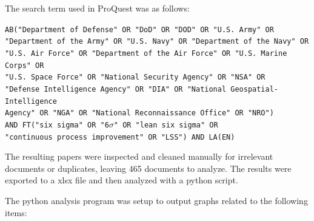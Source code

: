 \documentclass{article}
\begin{document}
	The search term used in ProQuest was as follows:

	\begin{minipage}{\linewidth}
	\begin{spacing}{0.8}
	\noindent\texttt{AB("Department of Defense" OR "DoD" OR "DOD" OR "U.S. Army" OR} \\
	\texttt{"Department of the Army" OR "U.S. Navy" OR "Department of the Navy" OR} \\
	\texttt{"U.S. Air Force" OR "Department of the Air Force" OR "U.S. Marine Corps" OR} \\
	\texttt{"U.S. Space Force" OR "National Security Agency" OR "NSA" OR} \\
	\texttt{"Defense Intelligence Agency" OR "DIA" OR "National Geospatial-Intelligence} \\
	\texttt{Agency" OR "NGA" OR "National Reconnaissance Office" OR "NRO")} \\
	\texttt{AND FT("six sigma" OR "6$\sigma$" OR "lean six sigma" OR} \\
	\texttt{"continuous process improvement" OR "LSS") AND LA(EN)}
	\end{spacing}
	\end{minipage}


	The resulting papers were inspected and cleaned manually for irrelevant documents or duplicates, leaving 465 documents to analyze.
	The results were exported to a xlsx file and then analyzed with a python script.

	The python analysis program was setup to output graphs related to the following items:
\end{document}
